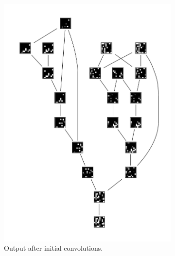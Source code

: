 \documentclass{llncs}
\begin{document}
\begin{figure}
\begin{subfigure}{.3\textwidth}
		\includegraphics[width=\linewidth]{conv}
		\caption{Output after initial convolutions.}
	\end{subfigure}
	\begin{subfigure}{.3\textwidth}
		\centering

\end{subfigure}
\end{figure}
\end{document}
